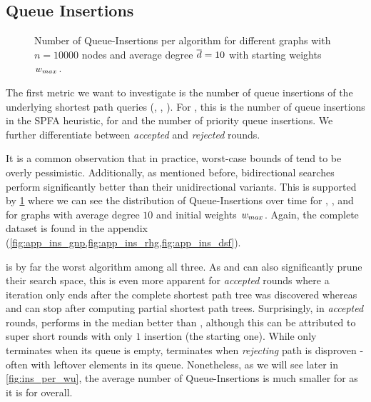 \subsection{Queue Insertions}
\begin{figure}[!tb]
  \centering
  \caption{
    Number of Queue-Insertions per algorithm for different graphs with $n = 10000$ nodes and average degree $\overline{d} = 10$ with starting weights $w_{max}$.
  }
  \label{fig:ins}
\end{figure}

The first metric we want to investigate is the number of queue insertions of the underlying shortest path queries (\algbf, \algdk, \algbd).
For \algbf, this is the number of queue insertions in the SPFA heuristic, for \algdk and \algbd the number of priority queue insertions.
We further differentiate between \emph{accepted} and \emph{rejected} rounds.

It is a common observation that in practice, worst-case bounds of \algbf tend to be overly pessimistic.
Additionally, as mentioned before, bidirectional searches perform significantly better than their unidirectional variants.
This is supported by \cref{fig:ins} where we can see the distribution of Queue-Insertions over time for \algbf, \algsp, and \algbp for graphs with average degree $10$ and initial weights $w_{max}$.
Again, the complete dataset is found in the appendix (\cref{fig:app_ins_gnp,fig:app_ins_rhg,fig:app_ins_dsf}).

\algbf is by far the worst algorithm among all three.
As \algdk and \algbd can also significantly prune their search space, this is even more apparent for \emph{accepted} rounds where a \algbf iteration only ends after the complete shortest path tree was discovered whereas \algdk and \algbd can stop after computing partial shortest path trees.
Surprisingly, in \emph{accepted} rounds, \algdk performs in the median better than \algbd, although this can be attributed to super short rounds with only $1$ insertion (the starting one).
While \algdk only terminates when its queue is empty, \algbd terminates when \emph{rejecting} path is disproven - often with leftover elements in its queue.
Nonetheless, as we will see later in \cref{fig:ins_per_wu}, the average number of Queue-Insertions is much smaller for \algbd as it is for \algdk overall.

